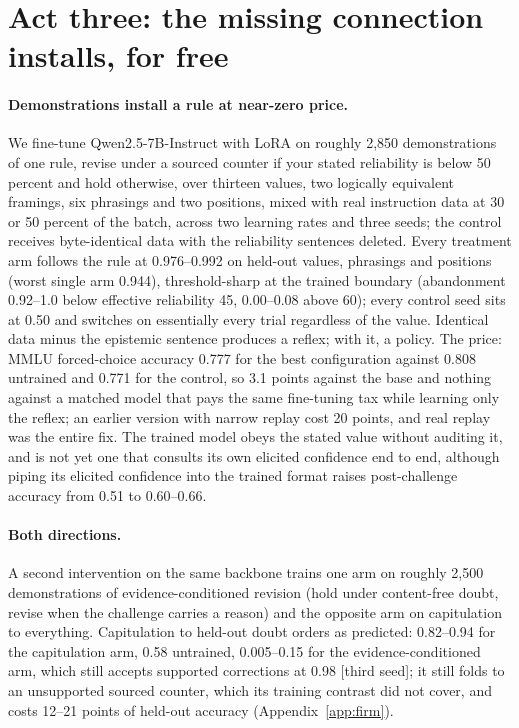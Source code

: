 \documentclass{article}
\newcommand{\pending}[1]{\textcolor{blue!70!black}{[#1]}}
\begin{document}
\section{Act three: the missing connection installs, for free}\label{sec:install}
\paragraph{Demonstrations install a rule at near-zero price.} We fine-tune Qwen2.5-7B-Instruct with LoRA on roughly 2{,}850 demonstrations of one rule, revise under a sourced counter if your stated reliability is below 50 percent and hold otherwise, over thirteen values, two logically equivalent framings, six phrasings and two positions, mixed with real instruction data \citep{lambert2024tulu3} at 30 or 50 percent of the batch, across two learning rates and three seeds; the control receives byte-identical data with the reliability sentences deleted. Every treatment arm follows the rule at 0.976--0.992 on held-out values, phrasings and positions (worst single arm 0.944), threshold-sharp at the trained boundary (abandonment 0.92--1.0 below effective reliability 45, 0.00--0.08 above 60); every control seed sits at 0.50 and switches on essentially every trial regardless of the value. Identical data minus the epistemic sentence produces a reflex; with it, a policy. The price: MMLU forced-choice accuracy 0.777 for the best configuration against 0.808 untrained and 0.771 for the control, so 3.1 points against the base and nothing against a matched model that pays the same fine-tuning tax while learning only the reflex; an earlier version with narrow replay cost 20 points, and real replay was the entire fix. The trained model obeys the stated value without auditing it, and is not yet one that consults its own elicited confidence end to end, although piping its elicited confidence into the trained format raises post-challenge accuracy from 0.51 to 0.60--0.66.
\paragraph{Both directions.} A second intervention on the same backbone trains one arm on roughly 2{,}500 demonstrations of evidence-conditioned revision (hold under content-free doubt, revise when the challenge carries a reason) and the opposite arm on capitulation to everything. Capitulation to held-out doubt orders as predicted: 0.82--0.94 for the capitulation arm, 0.58 untrained, 0.005--0.15 for the evidence-conditioned arm, which still accepts supported corrections at 0.98 \pending{third seed}; it still folds to an unsupported sourced counter, which its training contrast did not cover, and costs 12--21 points of held-out accuracy (Appendix~\ref{app:firm}).
\end{document}
